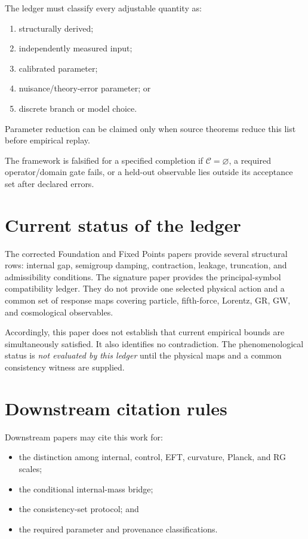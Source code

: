 \documentclass[11pt]{article}
\begin{document}
The ledger must classify every adjustable quantity as:
\begin{enumerate}
\item structurally derived;
\item independently measured input;
\item calibrated parameter;
\item nuisance/theory-error parameter; or
\item discrete branch or model choice.
\end{enumerate}
Parameter reduction can be claimed only when source theorems reduce this list
before empirical replay.

The framework is falsified for a specified completion if
$\mathcal C=\varnothing$, a required operator/domain gate fails, or a held-out
observable lies outside its acceptance set after declared errors.

\section{Current status of the ledger}

The corrected Foundation and Fixed Points papers provide several structural
rows: internal gap, semigroup damping, contraction, leakage, truncation, and
admissibility conditions. The signature paper provides the principal-symbol
compatibility ledger. They do not provide one selected physical action and a
common set of response maps covering particle, fifth-force, Lorentz, GR, GW,
and cosmological observables.

Accordingly, this paper does not establish that current empirical bounds are
simultaneously satisfied. It also identifies no contradiction. The
phenomenological status is \emph{not evaluated by this ledger} until the
physical maps and a common consistency witness are supplied.

\section{Downstream citation rules}

Downstream papers may cite this work for:
\begin{itemize}
\item the distinction among internal, control, EFT, curvature, Planck, and RG
scales;
\item the conditional internal-mass bridge;
\item the consistency-set protocol; and
\item the required parameter and provenance classifications.
\end{itemize}
\end{document}
